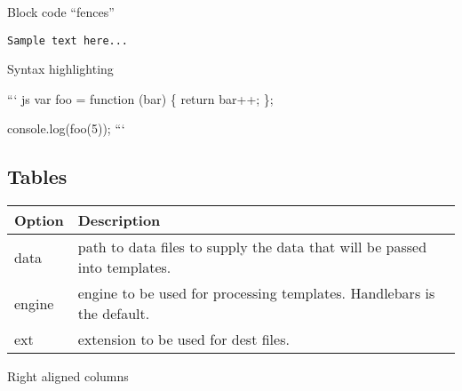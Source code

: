 \documentclass[]{article}
\begin{document}
Block code ``fences''

\texttt{Sample\ text\ here...}

Syntax highlighting

``` js var foo = function (bar) \{ return bar++; \};

console.log(foo(5)); ```

\subsection{Tables}\label{tables}

\begin{longtable}[]{@{}ll@{}}
\toprule
\begin{minipage}[b]{0.09\columnwidth}\raggedright\strut
Option\strut
\end{minipage} & \begin{minipage}[b]{0.16\columnwidth}\raggedright\strut
Description\strut
\end{minipage}\tabularnewline
\midrule
\endhead
\begin{minipage}[t]{0.09\columnwidth}\raggedright\strut
data\strut
\end{minipage} & \begin{minipage}[t]{0.16\columnwidth}\raggedright\strut
path to data files to supply the data that will be passed into
templates.\strut
\end{minipage}\tabularnewline
\begin{minipage}[t]{0.09\columnwidth}\raggedright\strut
engine\strut
\end{minipage} & \begin{minipage}[t]{0.16\columnwidth}\raggedright\strut
engine to be used for processing templates. Handlebars is the
default.\strut
\end{minipage}\tabularnewline
\begin{minipage}[t]{0.09\columnwidth}\raggedright\strut
ext\strut
\end{minipage} & \begin{minipage}[t]{0.16\columnwidth}\raggedright\strut
extension to be used for dest files.\strut
\end{minipage}\tabularnewline
\bottomrule
\end{longtable}

Right aligned columns
\end{document}
